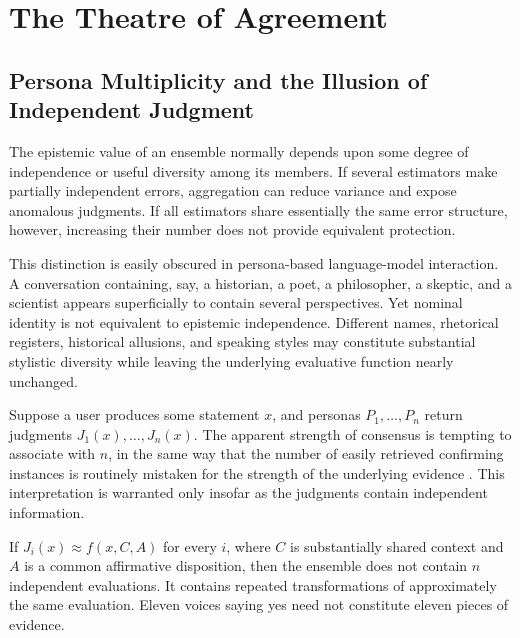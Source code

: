 
\chapter{The Theatre of Agreement}
\label{ch:ch03-theatre-of-agreement}
\section{Persona Multiplicity and the Illusion of Independent Judgment}

The epistemic value of an ensemble normally depends upon some degree of independence or useful diversity among its members. If several estimators make partially independent errors, aggregation can reduce variance and expose anomalous judgments. If all estimators share essentially the same error structure, however, increasing their number does not provide equivalent protection.

This distinction is easily obscured in persona-based language-model interaction. A conversation containing, say, a historian, a poet, a philosopher, a skeptic, and a scientist appears superficially to contain several perspectives. Yet nominal identity is not equivalent to epistemic independence. Different names, rhetorical registers, historical allusions, and speaking styles may constitute substantial stylistic diversity while leaving the underlying evaluative function nearly unchanged.

Suppose a user produces some statement $x$, and personas $P_1, \ldots, P_n$ return judgments $J_1(x), \ldots, J_n(x)$. The apparent strength of consensus is tempting to associate with $n$, in the same way that the number of easily retrieved confirming instances is routinely mistaken for the strength of the underlying evidence \cite{kahneman2011,tversky1974}. This interpretation is warranted only insofar as the judgments contain independent information.

\begin{proposition}
\label{prop:correlated-affirmation}
If $J_i(x) \approx f(x, C, A)$ for every $i$, where $C$ is substantially shared context and $A$ is a common affirmative disposition, then the ensemble does not contain $n$ independent evaluations. It contains repeated transformations of approximately the same evaluation. Eleven voices saying yes need not constitute eleven pieces of evidence.
\end{proposition}

